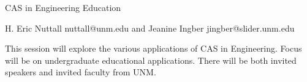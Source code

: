                      CAS in Engineering Education

                            H. Eric Nuttall
                            nuttall@unm.edu
                                  and
                            Jeanine Ingber
                        jingber@slider.unm.edu

This session will explore the various applications of CAS in Engineering.
Focus will be on undergraduate educational applications.  There will be
both invited speakers and invited faculty from UNM.
